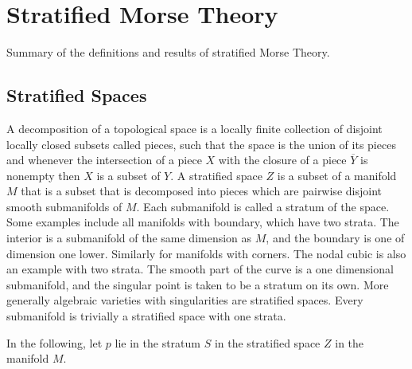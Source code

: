 
\section{Stratified Morse Theory}
\label{sec:Stratified Morse Theory}

Summary of the definitions and results of stratified Morse Theory.

\subsection{Stratified Spaces}
\label{sub:Stratified Spaces}
A decomposition of a topological space is a locally finite collection of disjoint locally closed subsets called pieces, such that the space is the union of its pieces and whenever the intersection of a piece $X$ with the closure of a piece $\overline{Y}$ is nonempty then $X$ is a subset of $Y$. A stratified space $Z$ is a subset of a manifold $M$ that is a subset that is decomposed into pieces which are pairwise disjoint smooth submanifolds of $M$. Each submanifold is called a stratum of the space. Some examples include all manifolds with boundary, which have two strata. The interior is a submanifold of the same dimension as $M$, and the boundary is one of dimension one lower. Similarly for manifolds with corners. The nodal cubic is also an example with two strata. The smooth part of the curve is a one dimensional submanifold, and the singular point is taken to be a stratum on its own. More generally algebraic varieties with singularities are stratified spaces. Every submanifold is trivially a stratified space with one strata.

In the following, let $p$ lie in the stratum $S$ in the stratified space $Z$ in the manifold $M$.

